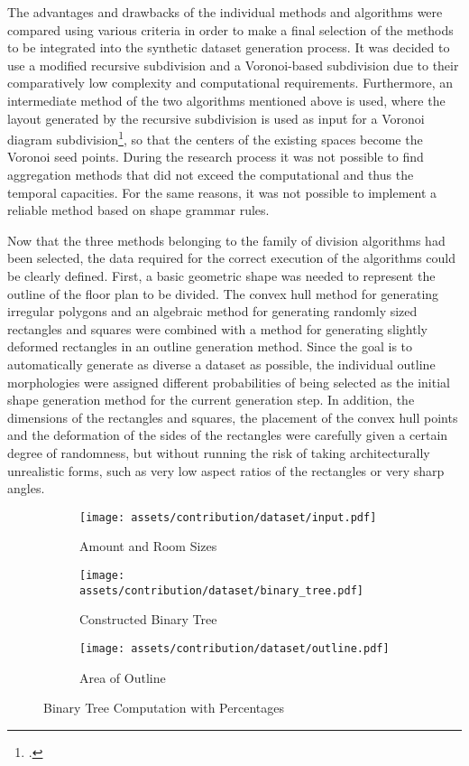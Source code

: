 \documentclass[a4paper, 12pt]{report}
\begin{document}
The advantages and drawbacks of the individual methods and algorithms were compared using various criteria in order to make a final selection of the methods to be integrated into the synthetic dataset generation process. It was decided to use a modified recursive subdivision and a Voronoi-based subdivision due to their comparatively low complexity and computational requirements. Furthermore, an intermediate method of the two algorithms mentioned above is used, where the layout generated by the recursive subdivision is used as input for a Voronoi diagram subdivision\footcite{balzer2005voronoi}, so that the centers of the existing spaces become the Voronoi seed points. During the research process it was not possible to find aggregation methods that did not exceed the computational and thus the temporal capacities. For the same reasons, it was not possible to implement a reliable method based on shape grammar rules.

Now that the three methods belonging to the family of division algorithms had been selected, the data required for the correct execution of the algorithms could be clearly defined. First, a basic geometric shape was needed to represent the outline of the floor plan to be divided. The convex hull method for generating irregular polygons and an algebraic method for generating randomly sized rectangles and squares were combined with a method for generating slightly deformed rectangles in an outline generation method. Since the goal is to automatically generate as diverse a dataset as possible, the individual outline morphologies were assigned different probabilities of being selected as the initial shape generation method for the current generation step. In addition, the dimensions of the rectangles and squares, the placement of the convex hull points and the deformation of the sides of the rectangles were carefully given a certain degree of randomness, but without running the risk of taking architecturally unrealistic forms, such as very low aspect ratios of the rectangles or very sharp angles.

\begin{figure}
\centering
\begin{subfigure}{.33\textwidth}
\centering
\texttt{[image: assets/contribution/dataset/input.pdf]}
\caption{Amount and Room Sizes}
\label{fig:amount-and-room-sizes}
\end{subfigure}%
\begin{subfigure}{.33\textwidth}
\centering
\texttt{[image: assets/contribution/dataset/binary\_tree.pdf]}
\caption{Constructed Binary Tree}
\label{fig:constructed-binary-tree}
\end{subfigure}%
\begin{subfigure}{.33\textwidth}
\centering
\texttt{[image: assets/contribution/dataset/outline.pdf]}
\caption{Area of Outline}
\label{fig:area-of-outline}
\end{subfigure}
\caption{Binary Tree Computation with Percentages}
\label{fig:binary-tree-computation-with-percentages}
\end{figure}
\end{document}
